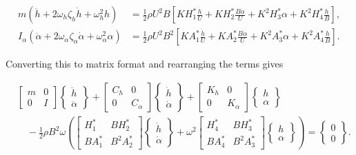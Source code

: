 \documentclass[../main]{subfiles}
\begin{document}
\begin{align}
    m\!\left(\ddot{h} + 2\omega_h\zeta_h\dot{h} + \omega_h^2 h\right)
        &= \frac{1}{2}\rho U^2 B
              \left[KH_1^*\frac{\dot{h}}{U}
                  + KH_2^*\frac{B\dot{\alpha}}{U}
                  + K^2H_3^*\alpha
                  + K^2H_4^*\frac{h}{B}\right], \\[4pt]
    I_\alpha\!\left(\ddot{\alpha} + 2\omega_\alpha\zeta_\alpha\dot{\alpha}
        + \omega_\alpha^2\alpha\right)
        &= \frac{1}{2}\rho U^2 B^2
              \left[KA_1^*\frac{\dot{h}}{U}
                  + KA_2^*\frac{B\dot{\alpha}}{U}
                  + K^2A_3^*\alpha
                  + K^2A_4^*\frac{h}{B}\right].
\end{align}

Converting this to matrix format and rearranging the terms gives

\begin{equation}
\begin{split}
    &\begin{bmatrix} m & 0 \\ 0 & I \end{bmatrix}
    \begin{Bmatrix} \ddot{h} \\ \ddot{\alpha} \end{Bmatrix}
    + \begin{bmatrix} C_h & 0 \\ 0 & C_\alpha \end{bmatrix}
    \begin{Bmatrix} \dot{h} \\ \dot{\alpha} \end{Bmatrix}
    + \begin{bmatrix} K_h & 0 \\ 0 & K_\alpha \end{bmatrix}
    \begin{Bmatrix} h \\ \alpha \end{Bmatrix} \\[6pt]
    &\quad
    - \frac{1}{2}\rho B^2 \omega
    \left(
    \begin{bmatrix} H_1^* & BH_2^* \\ BA_1^* & B^2A_2^* \end{bmatrix}
    \begin{Bmatrix} \dot{h} \\ \dot{\alpha} \end{Bmatrix}
    +\omega^2 \begin{bmatrix} H_4^* & BH_3^* \\ BA_4^* & B^2A_3^* \end{bmatrix}
    \begin{Bmatrix} h \\ \alpha \end{Bmatrix}
    \right)
    = \begin{Bmatrix} 0 \\ 0 \end{Bmatrix}.
\end{split}
\end{equation}
\end{document}
